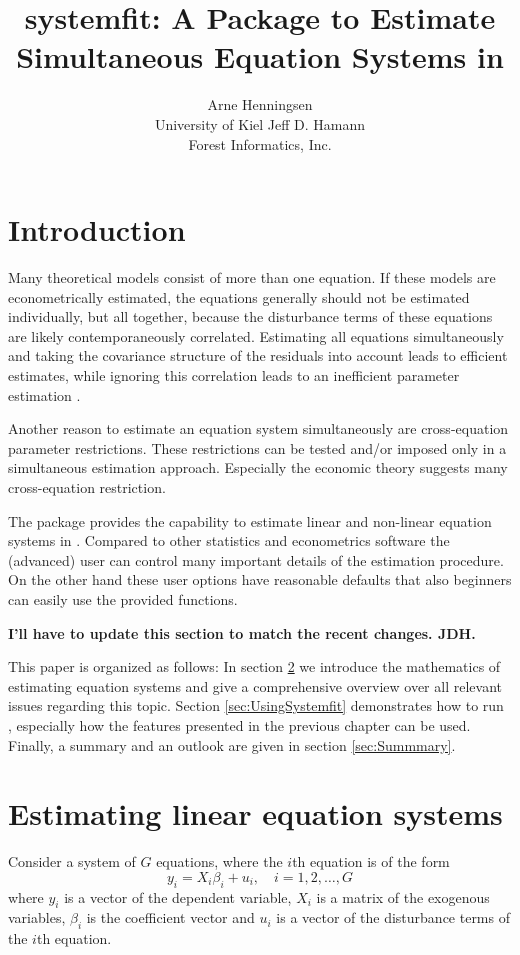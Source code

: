 \documentclass[article]{jss}
\author{Arne Henningsen\\University of Kiel\And 
        Jeff D. Hamann\\ Forest Informatics, Inc. }
\title{systemfit: A Package to Estimate\\
       Simultaneous Equation Systems in \proglang{R}}
\begin{document}
\section{Introduction}

Many theoretical models consist of more than one equation.  If these
models are econometrically estimated,  the equations generally should
not be estimated individually,  but all together, because the
disturbance terms of these  equations are likely contemporaneously
correlated.  Estimating all equations simultaneously and taking the
covariance structure of the residuals into account  leads to efficient
estimates,  while ignoring this correlation leads to an inefficient
parameter estimation \citep{zellner62}.

Another reason to estimate an equation system simultaneously are
cross-equation parameter restrictions. These restrictions can  be
tested and/or imposed only in a simultaneous estimation
approach. Especially the economic theory suggests many  cross-equation
restriction.

The  package provides the capability to estimate
linear and non-linear equation systems in .  Compared to
other statistics and econometrics software  the (advanced) user can
control many important details of the  estimation procedure. On the
other hand these user options have reasonable defaults that also
beginners can easily use the provided functions.

\textbf{I'll have to update this section to match the recent changes. JDH.}

This paper is organized as follows:  In section \ref{sec:Theory} we
introduce the mathematics of estimating equation systems and give a
comprehensive overview over all relevant issues regarding this topic.
Section \ref{sec:UsingSystemfit} demonstrates how to run
, especially how the features presented in the previous
chapter can be used.  Finally, a summary and an outlook are given in
section \ref{sec:Summmary}.


\section{Estimating linear equation systems}\label{sec:Theory}

Consider a system of $G$ equations, where the $i$th equation is of
the form 
\begin{equation}
   y_{i} = X_i \beta_i + u_i, \quad i = 1, 2, \ldots, G
\end{equation}
where $y_i$ is a vector of the dependent variable,
$X_i$ is a matrix of the exogenous variables,
$\beta_i$ is the coefficient vector and
$u_i$ is a vector of the disturbance terms of the $i$th equation.
\end{document}
